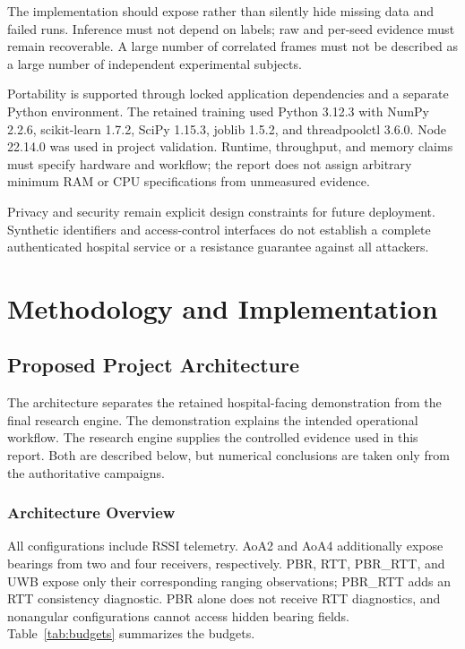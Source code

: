 \documentclass[12pt,a4paper]{report}
\begin{document}
The implementation should expose rather than silently hide missing data and failed runs. Inference must not depend on labels; raw and per-seed evidence must remain recoverable. A large number of correlated frames must not be described as a large number of independent experimental subjects.

Portability is supported through locked application dependencies and a separate Python environment. The retained training used Python 3.12.3 with NumPy 2.2.6, scikit-learn 1.7.2, SciPy 1.15.3, joblib 1.5.2, and threadpoolctl 3.6.0. Node 22.14.0 was used in project validation. Runtime, throughput, and memory claims must specify hardware and workflow; the report does not assign arbitrary minimum RAM or CPU specifications from unmeasured evidence.

Privacy and security remain explicit design constraints for future deployment. Synthetic identifiers and access-control interfaces do not establish a complete authenticated hospital service or a resistance guarantee against all attackers.

\chapter{Methodology and Implementation}

\section{Proposed Project Architecture}
The architecture separates the retained hospital-facing demonstration from the final research engine. The demonstration explains the intended operational workflow. The research engine supplies the controlled evidence used in this report. Both are described below, but numerical conclusions are taken only from the authoritative campaigns.

\subsection{Architecture Overview}
All configurations include RSSI telemetry. AoA2 and AoA4 additionally expose bearings from two and four receivers, respectively. PBR, RTT, PBR\_RTT, and UWB expose only their corresponding ranging observations; PBR\_RTT adds an RTT consistency diagnostic. PBR alone does not receive RTT diagnostics, and nonangular configurations cannot access hidden bearing fields. Table~\ref{tab:budgets} summarizes the budgets.
\end{document}
